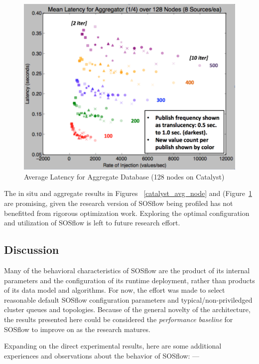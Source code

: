 \begin{figure}[h]
\centering
\includegraphics[width=\columnwidth]{images/avg_128.png}
\caption{Average Latency for Aggregate Database (128 nodes on Catalyst)}
\label{catalyst_avg_128}
\end{figure}

%
The in situ and aggregate results in Figures ~\ref{catalyst_avg_node}
and (Figure~\ref{catalyst_avg_128} are promising, given the research
version of SOSflow being profiled has not benefitted from rigorous
optimization work.
%
Exploring the optimal configuration and utilization of SOSflow is left
to future research effort.
%
\subsection{Discussion}
%
Many of the behavioral characteristics of SOSflow are the product of
its internal parameters and the configuration of its runtime
deployment, rather than products of its data model and algorithms.
%
For now, the effort was made to select reasonable default SOSflow
configuration parameters and typical/non-priviledged cluster queues
and topologies.
%
Because of the general novelty of the architecture, the results
presented here could be considered the \textit{performance baseline}
for SOSflow to improve on as the research matures.
%
\par
%
Expanding on the direct experimental results, here are some additional
experiences and observations about the behavior of SOSflow: ---
%
